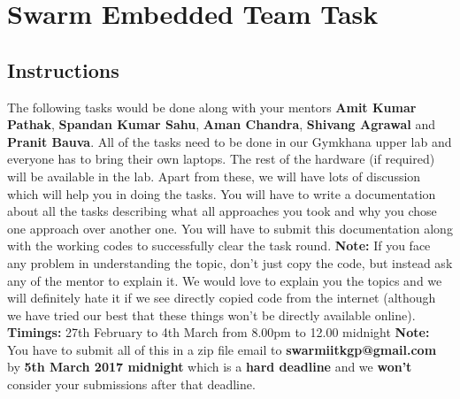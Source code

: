 \documentclass{article}
\begin{document}
\section*{Swarm Embedded Team Task}

\subsection*{Instructions} %
The following tasks would be done along with your mentors {\bf Amit Kumar Pathak}, {\bf Spandan Kumar Sahu}, {\bf Aman Chandra}, {\bf Shivang Agrawal} and {\bf Pranit Bauva}. All of the tasks need to be done in our Gymkhana upper lab and everyone has to bring their own laptops. The rest of the hardware (if required) will be available in the lab. Apart from these, we will have lots of discussion which will help you in doing the tasks. You will have to write a documentation about all the tasks describing what all approaches you took and why you chose one approach over another one. You will have to submit this documentation along with the working codes to successfully clear the task round. {\newline}{\newline}
{\bf Note:} If you face any problem in understanding the topic, don't just copy the code, but instead ask any of the mentor to explain it. We would love to explain you the topics and we will definitely hate it if we see directly copied code from the internet (although we have tried our best that these things won't be directly available online).
{\newline}{\newline}
{\bf Timings:} 27th February to 4th March from 8.00pm to 12.00 midnight
{\newline}{\newline}
{\bf Note:} You have to submit all of this in a zip file email to {\newline}{\bf  swarmiitkgp@gmail.com} by {\bf 5th March 2017 midnight} which is a {\bf hard deadline} and we {\bf won't} consider your submissions after that deadline.
\end{document}
